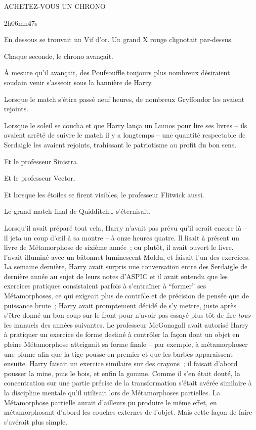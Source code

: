 \begin{center}
ACHETEZ-VOUS UN CHRONO

2h06mn47s
\end{center}

En dessous se trouvait un Vif d'or.
Un grand X rouge clignotait par-dessus.

\later

Chaque seconde, le chrono avançait.

À mesure qu'il avançait, des Poufsouffle toujours plus nombreux désiraient soudain venir s'asseoir sous la bannière de Harry.

Lorsque le match s'étira passé neuf heures, de nombreux Gryffondor les avaient rejoints.

Lorsque le soleil se coucha et que Harry lança un Lumos pour lire ses livres -- ils avaient arrêté de suivre le match il y a longtemps -- une quantité respectable de Serdaigle les avaient rejoints, trahissant le patriotisme au profit du bon sens.

Et le professeur Sinistra.

Et le professeur Vector.

Et lorsque les étoiles se firent visibles, le professeur Flitwick aussi.

Le grand match final de Quidditch… s'éternisait.

\later

Lorsqu'il avait préparé tout cela, Harry n'avait pas prévu qu'il serait encore là -- il jeta un coup d'œil à sa montre -- à onze heures quatre.
Il lisait à présent un livre de Métamorphose de sixième année~; ou plutôt, il avait ouvert le livre, l'avait illuminé avec un bâtonnet luminescent Moldu, et faisait l'un des exercices.
La semaine dernière, Harry avait surpris une conversation entre des Serdaigle de dernière année au sujet de leurs notes d'ASPIC et il avait entendu que les exercices pratiques consistaient parfois à s'entraîner à “former” ses Métamorphoses, ce qui exigeait plus de contrôle et de précision de pensée que de puissance brute~; Harry avait promptement décidé de s'y mettre, juste après s'être donné un bon coup sur le front pour n'avoir pas essayé plus tôt de lire \emph{tous} les manuels des années suivantes.
Le professeur McGonagall avait autorisé Harry à pratiquer un exercice de forme destiné à contrôler la façon dont un objet en pleine Métamorphose atteignait sa forme finale -- par exemple, à métamorphoser une plume afin que la tige pousse en premier et que les barbes apparaissent ensuite.
Harry faisait un exercice similaire sur des crayons~; il faisait d'abord pousser la mine, puis le bois, et enfin la gomme.
Comme il s'en était douté, la concentration sur une partie précise de la transformation s'était avérée similaire à la discipline mentale qu'il utilisait lors de Métamorphoses partielles.
La Métamorphose partielle aurait d'ailleurs pu produire le même effet, en métamorphosant d'abord les couches externes de l'objet.
Mais cette façon de faire s'avérait plus simple.

